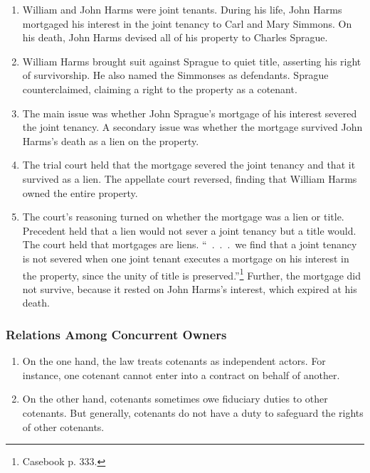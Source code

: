 \begin{enumerate}
    \item William and John Harms were joint tenants. During his life, John 
    Harms mortgaged his interest in the joint tenancy to Carl and Mary 
    Simmons. On his death, John Harms devised all of his property to Charles 
    Sprague.
    \item William Harms brought suit against Sprague to quiet title, asserting 
    his right of survivorship. He also named the Simmonses as defendants. 
    Sprague counterclaimed, claiming a right to the property as a cotenant.
    \item The main issue was whether John Sprague's mortgage of his interest 
    severed the joint tenancy. A secondary issue was whether the mortgage 
    survived John Harms's death as a lien on the property.
    \item The trial court held that the mortgage severed the joint tenancy and 
    that it survived as a lien. The appellate court reversed, finding that 
    William Harms owned the entire property.
    \item The court's reasoning turned on whether the mortgage was a lien or 
    title. Precedent held that a lien would not sever a joint tenancy but a 
    title would. The court held that mortgages are liens. ``~.~.~.~we find 
    that a joint tenancy is not severed when one joint tenant executes a 
    mortgage on his interest in the property, since the unity of title is 
    preserved.''\footnote{Casebook p. 333.} Further, the mortgage did not 
    survive, because it rested on John Harms's interest, which expired at his 
    death.
\end{enumerate}

\subsubsection{Relations Among Concurrent Owners}

\begin{enumerate}
    \item On the one hand, the law treats cotenants as independent actors. For 
    instance, one cotenant cannot enter into a contract on behalf of another.
    \item On the other hand, cotenants sometimes owe fiduciary duties to other 
    cotenants. But generally, cotenants do not have a duty to safeguard the 
    rights of other cotenants.
\end{enumerate}

